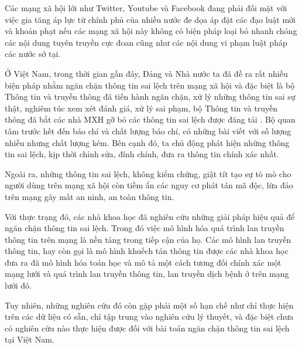 Các mạng xã hội lới như Twitter, Youtube và Facebook đang phải đối mặt với việc gia tăng áp lực từ chính phủ của nhiều nước đe dọa áp đặt các đạo luật mới và khoản phạt nếu các mạng xã hội này không có biện pháp loại bỏ nhanh chóng các nội dung tuyên truyền cực đoan cũng như các nội dung vi phạm luật pháp các nước sở tại. 

Ở Việt Nam, trong thời gian gần đây, Đảng và Nhà nước ta đã đề ra rất nhiều biện pháp nhằm ngăn chặn thông tin sai lệch trên mạng xã hội và đặc biệt là bộ Thông tin và truyền thông đã tiến hành ngăn chặn, xử lý những thông tin sai sự thật, nghiêm túc xem xét đánh giá, xử lý sai phạm, bộ Thông tin và truyền thông đã bắt các nhà MXH gỡ bỏ các thông tin sai lệch được đăng tải \cite{thongtin}. Bộ quan tâm trước hết đến báo chí và chất lượng báo chí, có những bài viết với số lượng nhiều nhưng chất lượng kém. Bên cạnh đó, ta chủ động phát hiện những thông tin sai lệch, kịp thời chỉnh sửa, đính chính, đưa ra thông tin chính xác nhất. 

Ngoài ra, những thông tin sai lệch, không kiểm chứng, giật tít tạo sự tò mò cho người dùng trên mạng xã hội còn tiềm ẩn các nguy cơ phát tán mã độc, lừa đảo trên mạng gây mất an ninh, an toàn thông tin.

Với thực trạng đó, các nhà khoa học đã nghiên cứu những giải pháp hiệu quả để ngăn chặn thông tin sai lệch. Trong đó việc mô hình hóa quá trình lan truyền thông tin trên mạng là nền tảng trong tiếp cận của họ. Các mô hình lan truyền thông tin, hay còn gọi là mô hình khuếch tán thông tin được các nhà khoa học đưa ra đã mô hình hóa toán học và mô tả một cách tương đối chính xác một mạng lưới và quá trình lan truyền thông tin, lan truyền dịch bệnh ở trên mạng lưới đó.

Tuy nhiên, những nghiên cứu đó còn gặp phải một số hạn chế như chỉ thực hiện trên các dữ liệu có sẵn, chỉ tập trung vào nghiên cứu lý thuyết, và đặc biệt chưa có nghiên cứu nào thực hiện được đối với bài toán ngăn chặn thông tin sai lệch tại Việt Nam.

